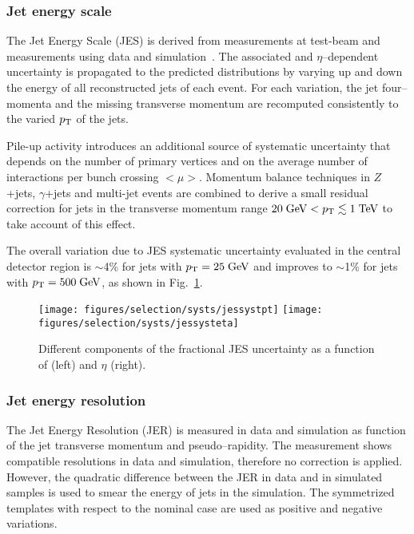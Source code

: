 \subsubsection{Jet energy scale}
\label{sec:syst_jes}

The Jet Energy Scale (JES) is derived from measurements at test-beam 
and measurements using data and simulation~\cite{jes}. 
The associated \pt{} and $\eta$--dependent uncertainty is propagated
to the predicted distributions by varying up and down the energy of
all reconstructed jets of each event. For each variation, the jet
four--momenta and the missing transverse momentum
\met{} are recomputed consistently to the varied $p_{\mathrm{T}}$ of the jets.

Pile-up activity introduces an additional source of systematic 
uncertainty that depends on the number of primary vertices
and on the average number of interactions per bunch crossing $<\mu>$. 
Momentum balance techniques in $Z$+jets, $\gamma$+jets and 
multi-jet events are combined to derive a small residual correction
for jets in the transverse momentum range $20\; \mathrm{GeV}{}<p_{\mathrm{T}}{}\lesssim
1\; \mathrm{TeV}$ to take account of this effect.

The overall variation due to JES systematic uncertainty 
evaluated in the central detector region 
is $\sim$4\% for jets with $p_{\mathrm{T}}{}=25\; \mathrm{GeV}$ and improves to $\sim$1\% for  
jets with $p_{\mathrm{T}}=500\; \mathrm{GeV}$, as shown in Fig.~\ref{fig:jessyst}.

\begin{figure}\centering
  \texttt{[image: figures/selection/systs/jessystpt]}
  \texttt{[image: figures/selection/systs/jessysteta]}
  \caption{
    Different components of the fractional JES uncertainty as a function of \pt{}
    (left) and $\eta$ (right).
  }
  \label{fig:jessyst}
\end{figure}

\subsubsection{Jet energy resolution}
\label{sec:syst_jer}

The Jet Energy Resolution (JER) is measured in data and simulation
as function of the jet transverse momentum and pseudo--rapidity.
The measurement shows compatible resolutions in data and simulation,
therefore no correction is applied. However, the quadratic difference
between the JER in data and in simulated samples is used to smear the
energy of jets in the simulation. The symmetrized templates with
respect to the nominal case are used as positive and negative
variations.

